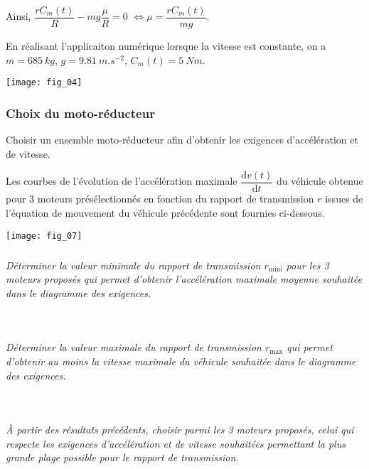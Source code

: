 \begin{multicols}{2}
\begin{corrige}
Ainsi, $\dfrac{rC_m(t)}{R}-mg\dfrac{\mu}{R}=0$ $ \Leftrightarrow \mu = \dfrac{rC_m(t)}{mg}$.

En réalisant l'applicaiton numérique lorsque la vitesse est constante, on a $m=\SI{685}{kg}$, $g=\SI{9,81}{m.s^{-2}}$, $C_m(t)=\SI{5}{Nm}$.
\end{corrige}
\else


\begin{center}
\texttt{[image: fig\_04]}
\end{center}

\fi

\subsubsection*{Choix du moto-réducteur}
\begin{obj}
Choisir un ensemble moto-réducteur afin d’obtenir les exigences d’accélération et de vitesse.
\end{obj}
\ifprof
\else
Les courbes de l’évolution de l’accélération maximale $\dfrac{\text{d} v(t)}{\text{d} t}$
du véhicule obtenue pour 3 moteurs présélectionnés en fonction du rapport de transmission $r$ issues de l’équation de mouvement du véhicule précédente sont fournies ci-dessous.


\begin{center}
\texttt{[image: fig\_07]}
\end{center}

\fi

\subparagraph{}\textit{Déterminer la valeur minimale du rapport de transmission $r_{\text{mini}}$ pour les 3 moteurs proposés qui permet d’obtenir l’accélération maximale moyenne souhaitée dans le diagramme des exigences.}
\ifprof
\begin{corrige}~\\
\end{corrige}
\else
\fi


\subparagraph{}\textit{Déterminer la valeur maximale du rapport de transmission $r_{\text{max}}$ qui permet d’obtenir au moins la vitesse maximale du véhicule souhaitée dans le diagramme des exigences.}
\ifprof
\begin{corrige}~\\
\end{corrige}
\else
\fi


\subparagraph{}\textit{À partir des résultats précédents, choisir parmi les 3 moteurs proposés, celui qui respecte les exigences d’accélération et de vitesse souhaitées permettant la plus grande plage possible pour le rapport de transmission.}
\ifprof
\begin{corrige}~\\
\end{corrige}
\else
\fi



\end{multicols}
